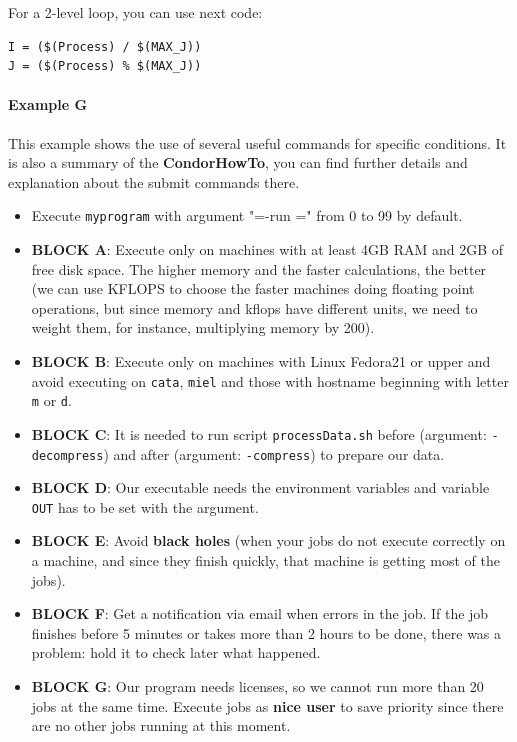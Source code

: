 \documentclass[a4paper,10pt]{article}
\begin{document}
For a 2-level loop, you can use next code:

\begin{verbatim}
I = ($(Process) / $(MAX_J))
J = ($(Process) % $(MAX_J))
\end{verbatim}

\paragraph{Example G}
\label{sec:org5badebf}

This example shows the use of several useful commands for specific
conditions. It is also a summary of the \textbf{CondorHowTo}, you can find
further details and explanation about the submit commands there. 

\begin{itemize}
\item Execute \texttt{myprogram} with argument "=-run =" from 0 to 99 by default.
\item \textbf{BLOCK A}: Execute only on machines with at least 4GB RAM and 2GB of free
disk space. The higher memory and the faster calculations, the better (we can
use KFLOPS to choose the faster machines doing floating point operations, but
since memory and kflops have different units, we need to weight them, for
instance, multiplying memory by 200).
\item \textbf{BLOCK B}: Execute only on machines with Linux Fedora21 or upper and avoid
executing on \texttt{cata}, \texttt{miel} and those with hostname beginning with letter \texttt{m}
or \texttt{d}.
\item \textbf{BLOCK C}: It is needed to run script \texttt{processData.sh} before (argument:
\texttt{-decompress}) and after (argument: \texttt{-compress}) to prepare our data.
\item \textbf{BLOCK D}: Our executable needs the environment variables and variable \texttt{OUT}
has to be set with the argument.
\item \textbf{BLOCK E}: Avoid \textbf{black holes} (when your jobs do not execute correctly on
a machine, and since they finish quickly, that machine is getting most of the
jobs).
\item \textbf{BLOCK F}: Get a notification via email when errors in the job. If the job
finishes before 5 minutes or takes more than 2 hours to be done, there was a
problem: hold it to check later what happened.
\item \textbf{BLOCK G}: Our program needs licenses, so we cannot run more than 20 jobs at
the same time. Execute jobs as \textbf{nice user} to save priority since there are
no other jobs running at this moment.
\end{itemize}
\end{document}
